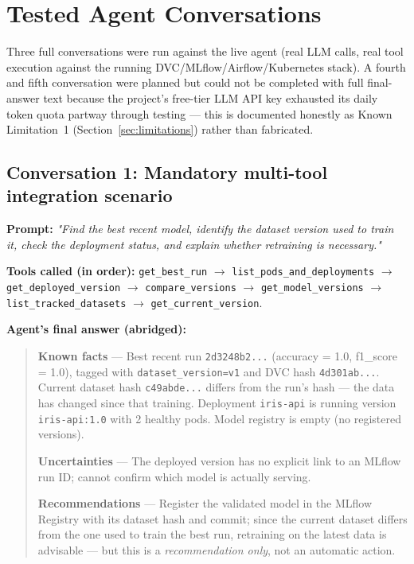 \documentclass[11pt,a4paper]{article}
\begin{document}
\section{Tested Agent Conversations}

Three full conversations were run against the live agent (real LLM calls,
real tool execution against the running DVC/MLflow/Airflow/Kubernetes
stack). A fourth and fifth conversation were planned but could not be
completed with full final-answer text because the project's free-tier LLM
API key exhausted its daily token quota partway through testing --- this is
documented honestly as Known Limitation~1 (Section~\ref{sec:limitations})
rather than fabricated.

\subsection{Conversation 1: Mandatory multi-tool integration scenario}

\textbf{Prompt:} \textit{"Find the best recent model, identify the dataset
version used to train it, check the deployment status, and explain whether
retraining is necessary."}

\textbf{Tools called (in order):} \texttt{get\_best\_run} $\to$
\texttt{list\_pods\_and\_deployments} $\to$ \texttt{get\_deployed\_version}
$\to$ \texttt{compare\_versions} $\to$ \texttt{get\_model\_versions} $\to$
\texttt{list\_tracked\_datasets} $\to$ \texttt{get\_current\_version}.

\textbf{Agent's final answer (abridged):}
\begin{quote}
\small
\textbf{Known facts} --- Best recent run \texttt{2d3248b2...} (accuracy =
1.0, f1\_score = 1.0), tagged with \texttt{dataset\_version=v1} and DVC hash
\texttt{4d301ab...}. Current dataset hash \texttt{c49abde...} differs from
the run's hash --- the data has changed since that training. Deployment
\texttt{iris-api} is running version \texttt{iris-api:1.0} with 2 healthy
pods. Model registry is empty (no registered versions).

\textbf{Uncertainties} --- The deployed version has no explicit link to an
MLflow run ID; cannot confirm which model is actually serving.

\textbf{Recommendations} --- Register the validated model in the MLflow
Registry with its dataset hash and commit; since the current dataset differs
from the one used to train the best run, retraining on the latest data is
advisable --- but this is a \emph{recommendation only}, not an automatic
action.
\end{quote}
\end{document}
